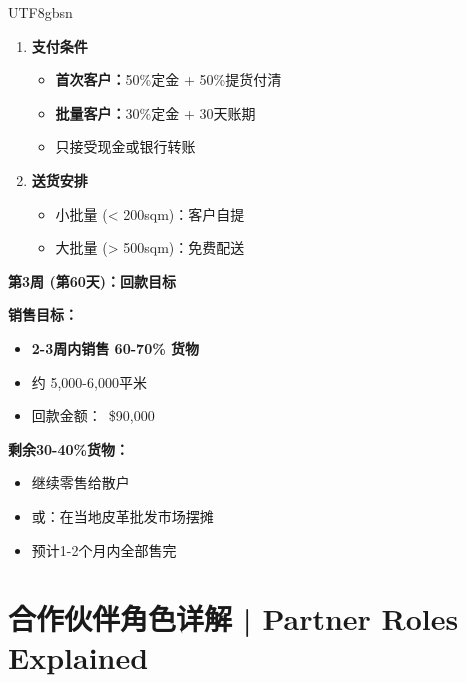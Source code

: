 \documentclass[12pt,a4paper]{article}
\begin{document}
\begin{CJK}{UTF8}{gbsn}
\begin{enumerate}
    \item \textbf{支付条件}
    \begin{itemize}
        \item \textbf{首次客户：}50\%定金 + 50\%提货付清
        \item \textbf{批量客户：}30\%定金 + 30天账期
        \item 只接受现金或银行转账
    \end{itemize}
    
    \item \textbf{送货安排}
    \begin{itemize}
        \item 小批量 (< 200sqm)：客户自提
        \item 大批量 (> 500sqm)：免费配送
    \end{itemize}
\end{enumerate}

\textbf{第3周 (第60天)：回款目标}

\textbf{销售目标：}
\begin{itemize}
    \item \textbf{2-3周内销售 60-70\% 货物}
    \item 约 5,000-6,000平米
    \item 回款金额：~\$90,000
\end{itemize}

\textbf{剩余30-40\%货物：}
\begin{itemize}
    \item 继续零售给散户
    \item 或：在当地皮革批发市场摆摊
    \item 预计1-2个月内全部售完
\end{itemize}

\end{CJK}

\newpage

\section{合作伙伴角色详解 | Partner Roles Explained}
\end{document}
